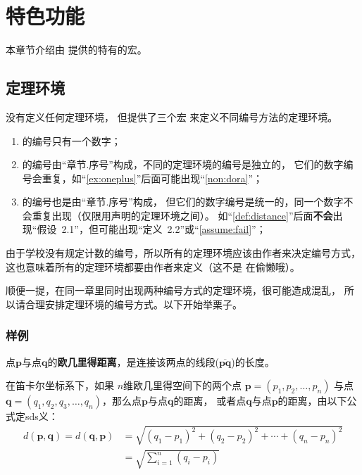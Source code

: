 \chapter{特色功能}

本章节介绍由 \nuaathesis{} 提供的特有的宏。

\section{定理环境}

\nuaathesis{} 没有定义任何定理环境，
但提供了三个宏  来定义不同编号方法的定理环境。
\begin{enumerate}
  \item {} 的编号只有一个数字；
  \item {} 的编号由“章节.序号”构成，不同的定理环境的编号是独立的，
  它们的数字编号会重复，如“\autoref{ex:oneplus}”后面可能出现“\autoref{non:dora}”；
  \item {} 的编号也是由“章节.序号”构成，
  但它们的数字编号是统一的，同一个数字不会重复出现（仅限用声明的定理环境之间）。
  如“\autoref{def:distance}”后面\textbf{不会}出现“假设~2.1”，但可能出现“定义~2.2”或“\autoref{assume:fail}”；
\end{enumerate}

由于学校没有规定计数的编号，所以所有的定理环境应该由作者来决定编号方式，
这也意味着所有的定理环境都要由作者来定义（这不是 \nuaathesis{} 在偷懒哦）。

顺便一提，在同一章里同时出现两种编号方式的定理环境，很可能造成混乱，
所以请合理安排定理环境的编号方式。以下开始举栗子。

\subsection*{样例}

\begin{definition}[欧几里得距离]
\label{def:distance}
点$\mathbf{p}$与点$\mathbf{q}$的\textbf{欧几里得距离}，是连接该两点的线段($\overline{\mathbf{pq}}$)的长度。

在笛卡尔坐标系下，如果 $n$维欧几里得空间下的两个点 $\mathbf{p}=(p_1, p_2, \dots, p_n)$ 与点
$\mathbf{q} = (q_1, q_2, q_3, \dots, q_n)$，那么点$\mathbf{p}$与点$\mathbf{q}$的距离，
或者点$\mathbf{q}$与点$\mathbf{p}$的距离，由以下公式定sds义：
\begin{align}
\label{equ:1}
d(\mathbf{p},\mathbf{q}) = d(\mathbf{q},\mathbf{p}) & = \sqrt{(q_1-p_1)^2 + (q_2-p_2)^2 + \cdots + (q_n-p_n)^2} \\
\label{equ:2}
& = \sqrt{\sum_{i=1}^n (q_i-p_i)}
\end{align}
\end{definition}

